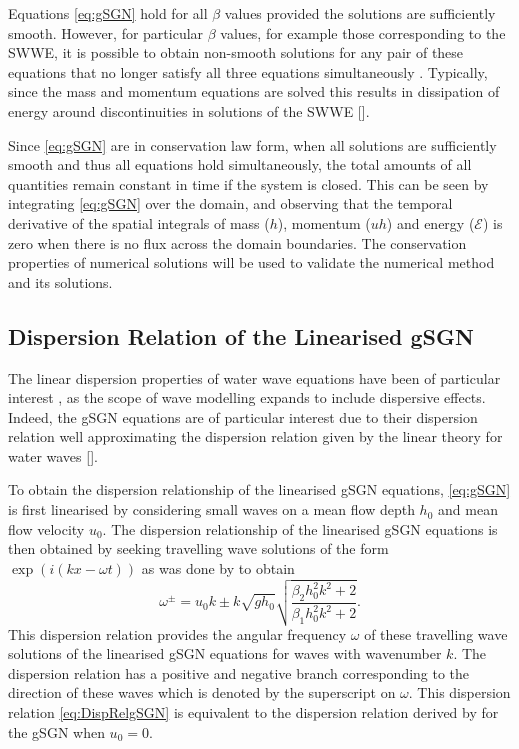 \documentclass[10pt]{elsarticle}
\begin{document}
Equations \eqref{eq:gSGN} hold for all $\beta$ values provided the solutions are sufficiently smooth. However, for particular $\beta$ values, for example those corresponding to the SWWE, it is possible to obtain non-smooth solutions for any pair of these equations that no longer satisfy all three equations simultaneously \cite{Pu-2018-1361}. Typically, since the mass and momentum equations are solved this results in dissipation of energy around discontinuities in solutions of the SWWE []. 

Since \eqref{eq:gSGN} are in conservation law form, when all solutions are sufficiently smooth and thus all equations hold simultaneously, the total amounts of all quantities remain constant in time if the system is closed. This can be seen by integrating \eqref{eq:gSGN} over the domain, and observing that the temporal derivative of the spatial integrals of mass ($h$), momentum ($uh$) and energy ($\mathcal{E}$) is zero when there is no flux across the domain boundaries. The conservation properties of numerical solutions will be used to validate the numerical method and its solutions. 

\subsection{Dispersion Relation of the Linearised gSGN}
The linear dispersion properties of water wave equations have been of particular interest \cite{Filippini-etal-2016-381,Clamond-et.al-2017-245,DoCarmo-2019-125}, as the scope of wave modelling expands to include dispersive effects. Indeed, the gSGN equations are of particular interest due to their dispersion relation well approximating the dispersion relation given by the linear theory for water waves []. 

To obtain the dispersion relationship of the linearised gSGN equations, \eqref{eq:gSGN} is first linearised by considering small waves on a mean flow depth $h_0$ and mean flow velocity $u_0$. The dispersion relationship of the linearised gSGN equations is then obtained by seeking travelling wave solutions of the form $\exp\left(i (k x - \omega t)\right)$ as was done by \citet{Zoppou-etal-2017} to obtain
\begin{equation}
\omega^\pm = u_0 k \pm k \sqrt{gh_0} \sqrt{\dfrac{\beta_2 h_0^2 k^2 + 2}{\beta_1 h_0^2 k^2 + 2} }.
\label{eq:DispRelgSGN}
\end{equation}
This dispersion relation provides the angular frequency $\omega$ of these travelling wave solutions of the linearised gSGN equations for waves with wavenumber $k$. The dispersion relation has a positive and negative branch corresponding to the direction of these waves which is denoted by the superscript on $\omega$. This dispersion relation \eqref{eq:DispRelgSGN} is equivalent to the dispersion relation derived by \citet{Clamond-Dutykh-2018-237} for the gSGN when $u_0 = 0$. 
\end{document}
